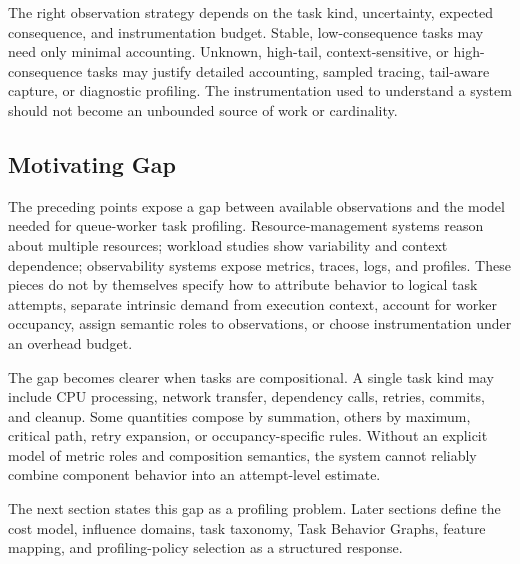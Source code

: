 The right observation strategy depends on the task kind, uncertainty, expected
consequence, and instrumentation budget. Stable, low-consequence tasks may need
only minimal accounting. Unknown, high-tail, context-sensitive, or
high-consequence tasks may justify detailed accounting, sampled tracing,
tail-aware capture, or diagnostic profiling. The instrumentation used to
understand a system should not become an unbounded source of work or cardinality.

\subsection{Motivating Gap}
\label{sec:background-motivating-gap}

The preceding points expose a gap between available observations and the model
needed for queue-worker task profiling. Resource-management systems reason about
multiple resources; workload studies show variability and context dependence;
observability systems expose metrics, traces, logs, and profiles. These pieces
do not by themselves specify how to attribute behavior to logical task attempts,
separate intrinsic demand from execution context, account for worker occupancy,
assign semantic roles to observations, or choose instrumentation under an
overhead budget.

The gap becomes clearer when tasks are compositional. A single task kind may
include CPU processing, network transfer, dependency calls, retries, commits,
and cleanup. Some quantities compose by summation, others by maximum, critical
path, retry expansion, or occupancy-specific rules. Without an explicit model of
metric roles and composition semantics, the system cannot reliably combine
component behavior into an attempt-level estimate.

The next section states this gap as a profiling problem. Later sections define
the cost model, influence domains, task taxonomy, Task Behavior Graphs, feature
mapping, and profiling-policy selection as a structured response.
